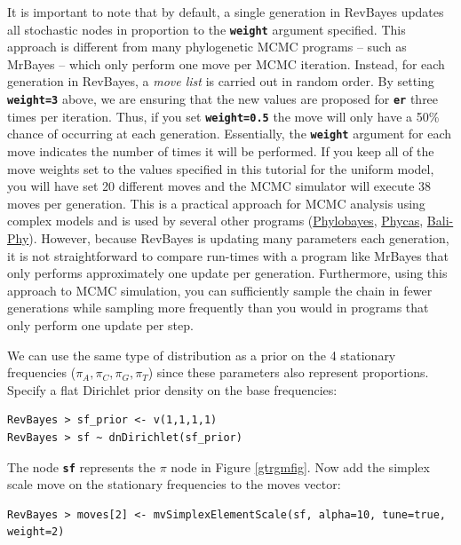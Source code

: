 \documentclass[11pt]{article}
\newcommand{\cl}[1]{{\texttt{\textbf{#1}}}}
\begin{document}
It is important to note that by default, a single generation in RevBayes updates all stochastic nodes in proportion to the \cl{weight} argument specified. 
This approach is different from many phylogenetic MCMC programs -- such as MrBayes -- which only perform one move per MCMC iteration. 
Instead, for each generation in RevBayes, a \textit{move list} is carried out in random order. 
By setting \cl{weight=3} above, we are ensuring that the new values are proposed for \cl{er} three times per iteration. 
Thus, if you set \cl{weight=0.5} the move will only have a 50\% chance of occurring at each generation. 
Essentially, the \cl{weight} argument for each move indicates the number of times it will be performed.
If you keep all of the move weights set to the values specified in this tutorial for the uniform model, you will have set 20 different moves and the MCMC simulator will execute 38 moves per generation.
This is a practical approach for MCMC analysis using complex models and is used by several other programs (\href{http://megasun.bch.umontreal.ca/People/lartillot/www/index.htm}{Phylobayes}, \href{http://hydrodictyon.eeb.uconn.edu/projects/phycas/index.php/Phycas_Home}{Phycas}, \href{http://www.bali-phy.org/}{Bali-Phy}).
However, because RevBayes is updating many parameters each generation, it is not straightforward to compare run-times with a program like MrBayes that only performs approximately one update per generation. 
Furthermore, using this approach to MCMC simulation, you can sufficiently sample the chain in fewer generations while sampling more frequently than you would in programs that only perform one update per step.

We can use the same type of distribution as a prior on the 4 stationary frequencies ($\pi_A, \pi_C, \pi_G, \pi_T$) since these parameters also represent proportions. 
Specify a flat Dirichlet prior density on the base frequencies:
{\tt \begin{snugshade*}
\begin{lstlisting}
RevBayes > sf_prior <- v(1,1,1,1) 
RevBayes > sf ~ dnDirichlet(sf_prior)
\end{lstlisting}
\end{snugshade*}}

The node \cl{sf} represents the $\pi$ node in Figure \ref{gtrgmfig}.
Now add the simplex scale move on the stationary frequencies to the moves vector:
{\tt \small \begin{snugshade*}
\begin{lstlisting}
RevBayes > moves[2] <- mvSimplexElementScale(sf, alpha=10, tune=true, weight=2)  
\end{lstlisting}
\end{snugshade*}}
\end{document}
